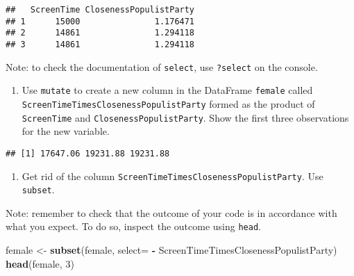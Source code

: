 \documentclass[
]{book}
\newenvironment{Shaded}{\begin{snugshade}}{\end{snugshade}}
\newcommand{\AttributeTok}[1]{\textcolor[rgb]{0.13,0.29,0.53}{#1}}
\newcommand{\DecValTok}[1]{\textcolor[rgb]{0.00,0.00,0.81}{#1}}
\newcommand{\FunctionTok}[1]{\textcolor[rgb]{0.13,0.29,0.53}{\textbf{#1}}}
\newcommand{\NormalTok}[1]{#1}
\newcommand{\OtherTok}[1]{\textcolor[rgb]{0.56,0.35,0.01}{#1}}
\newcommand{\SpecialCharTok}[1]{\textcolor[rgb]{0.81,0.36,0.00}{\textbf{#1}}}
\providecommand{\tightlist}{%
  \setlength{\itemsep}{0pt}\setlength{\parskip}{0pt}}
\begin{document}
\begin{verbatim}
##   ScreenTime ClosenessPopulistParty
## 1      15000               1.176471
## 2      14861               1.294118
## 3      14861               1.294118
\end{verbatim}

Note: to check the documentation of \texttt{select}, use \texttt{?select} on the console.

\begin{enumerate}
\def\labelenumi{\arabic{enumi}.}
\setcounter{enumi}{3}
\tightlist
\item
  Use \texttt{mutate} to create a new column in the DataFrame \texttt{female} called \texttt{ScreenTimeTimesClosenessPopulistParty} formed as the product of \texttt{ScreenTime} and \texttt{ClosenessPopulistParty}. Show the first three observations for the new variable.
\end{enumerate}

\begin{Shaded}
\end{Shaded}

\begin{verbatim}
## [1] 17647.06 19231.88 19231.88
\end{verbatim}

\begin{enumerate}
\def\labelenumi{\arabic{enumi}.}
\setcounter{enumi}{4}
\tightlist
\item
  Get rid of the column \texttt{ScreenTimeTimesClosenessPopulistParty}. Use \texttt{subset}.
\end{enumerate}

Note: remember to check that the outcome of your code is in accordance with what you expect. To do so, inspect the outcome using \texttt{head}.

\begin{Shaded}
\begin{Highlighting}[]
\NormalTok{female }\OtherTok{\textless{}{-}} \FunctionTok{subset}\NormalTok{(female, }\AttributeTok{select=} \SpecialCharTok{{-}}\NormalTok{ ScreenTimeTimesClosenessPopulistParty)}
\FunctionTok{head}\NormalTok{(female, }\DecValTok{3}\NormalTok{)}
\end{Highlighting}
\end{Shaded}
\end{document}
